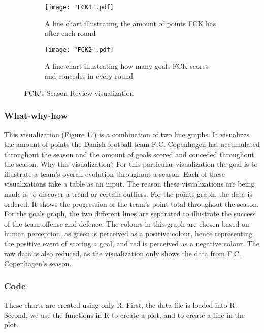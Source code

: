 \documentclass[Report.tex]{subfiles}
\begin{document}
\begin{figure}
\center
\begin{subfigure}[b]{0.8\textwidth}
\texttt{[image: "FCK1".pdf]}
\caption{A line chart illustrating the amount of points FCK has after each round}
\end{subfigure}

\begin{subfigure}[b]{0.8\textwidth}
\texttt{[image: "FCK2".pdf]}
\caption{A line chart illustrating how many goals FCK scores and concedes in every round}
\end{subfigure}
\caption{FCK's Season Review visualization}
\end{figure}


\subsubsection{What-why-how}
This visualization (Figure 17) is a combination of two line graphs. It visualizes the amount of points the Danish football team F.C. Copenhagen has accumulated throughout the season and the amount of goals scored and conceded throughout the season. Why this visualization? For this particular visualization the goal is to illustrate a team’s overall evolution throughout a season. Each of these visualizations take a table as an input. The reason these visualizations are being made is to discover a trend or certain outliers. For the points graph, the data is ordered. It shows the progression of the team’s point total throughout the season. For the goals graph, the two different lines are separated to illustrate the success of the team offense and defence. The colours in this graph are chosen based on human perception, as green is perceived as a positive colour, hence representing the positive event of scoring a goal, and red is perceived as a negative colour. The raw data is also reduced, as the visualization only shows the data from F.C. Copenhagen’s season. 
\subsubsection{Code}
These charts are created using only R. First, the data file is loaded into R. Second, we use the functions in R to create a plot, and to create a line in the plot. 
\end{document}
